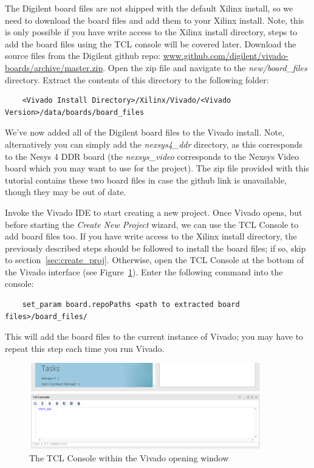 \documentclass[11pt]{article}
\begin{document}
The Digilent board files are not shipped with the default Xilinx install, so we need to download the board files and add them to your Xilinx install. Note, this is only possible if you have write access to the Xilinx install directory, steps to add the board files using the TCL console will be covered later. Download the source files from the Digilent github repo: \color{blue}
\href{https://www.github.com/digilent/vivado-boards/archive/master.zip}{www.github.com/digilent/vivado-boards/archive/master.zip}\color{black}. Open the zip file and navigate to the \textit{new/board\_files} directory. Extract the contents of this directory to the following folder:

\begin{verbatim}
    <Vivado Install Directory>/Xilinx/Vivado/<Vivado Version>/data/boards/board_files
\end{verbatim}

\noindent
We've now added all of the Digilent board files to the Vivado install. Note, alternatively you can simply add the \textit{nexsys4\_ddr} directory, as this corresponds to the Nesys 4 DDR board (the \textit{nexsys\_video} corresponds to the Nexsys Video board which you may want to use for the project). The zip file provided with this tutorial contains these two board files in case the github link is unavailable, though they may be out of date.

Invoke the Vivado IDE to start creating a new project. Once Vivado opens, but before starting the \textit{Create New Project} wizard, we can use the TCL Console to add board files too. If you have write access to the Xilinx install directory, the previously described steps should be followed to install the board files; if so, skip to section~\ref{sec:create_proj}. Otherwise, open the TCL Console at the bottom of the Vivado interface (see Figure~\ref{fig:viv_tcl_con}). Enter the following command into the console:

\begin{verbatim}
    set_param board.repoPaths <path to extracted board files>/board_files/
\end{verbatim}

\noindent
This will add the board files to the current instance of Vivado; you may have to repeat this step each time you run Vivado.

\begin{figure}[!h]
    \centering
    \includegraphics[width=0.9\textwidth]{images/viv_tcl_con.png}
    \caption{The TCL Console within the Vivado opening window}
    \label{fig:viv_tcl_con}
\end{figure}
\end{document}
